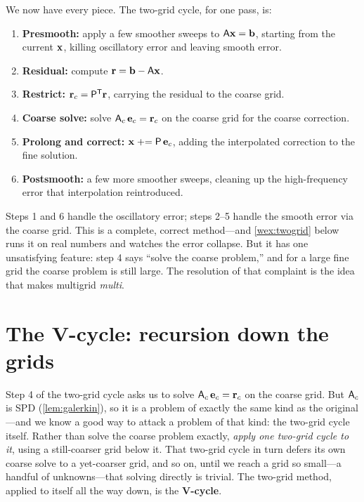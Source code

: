 We now have every piece. The two-grid cycle, for one pass, is:
\begin{enumerate}[nosep]
\item \textbf{Presmooth:} apply a few smoother sweeps to $\mathsf{A}\mathbf{x}=\mathbf{b}$, starting from
  the current $\mathbf{x}$, killing oscillatory error and leaving smooth error.
\item \textbf{Residual:} compute $\mathbf{r} = \mathbf{b} - \mathsf{A}\mathbf{x}$.
\item \textbf{Restrict:} $\mathbf{r}_c = \mathsf{P}^{\mathsf T}\mathbf{r}$, carrying the residual to the
  coarse grid.
\item \textbf{Coarse solve:} solve $\mathsf{A}_c\,\mathbf{e}_c = \mathbf{r}_c$ on the coarse grid for the
  coarse correction.
\item \textbf{Prolong and correct:} $\mathbf{x} \mathrel{+}= \mathsf{P}\,\mathbf{e}_c$, adding the
  interpolated correction to the fine solution.
\item \textbf{Postsmooth:} a few more smoother sweeps, cleaning up the high-frequency
  error that interpolation reintroduced.
\end{enumerate}
Steps 1 and 6 handle the oscillatory error; steps 2--5 handle the smooth error via the
coarse grid. This is a complete, correct method---and \cref{wex:twogrid} below runs it on
real numbers and watches the error collapse. But it has one unsatisfying feature: step 4
says ``solve the coarse problem,'' and for a large fine grid the coarse problem is still
large. The resolution of that complaint is the idea that makes multigrid \emph{multi}.

\section{The V-cycle: recursion down the grids}
\label{sec:vcycle}

Step 4 of the two-grid cycle asks us to solve $\mathsf{A}_c\,\mathbf{e}_c=\mathbf{r}_c$ on the coarse grid.
But $\mathsf{A}_c$ is SPD (\cref{lem:galerkin}), so it is a problem of exactly the same kind
as the original---and we know a good way to attack a problem of that kind: the two-grid
cycle itself. Rather than solve the coarse problem exactly, \emph{apply one two-grid cycle
to it}, using a still-coarser grid below it. That two-grid cycle in turn defers its own
coarse solve to a yet-coarser grid, and so on, until we reach a grid so small---a handful
of unknowns---that solving directly is trivial. The two-grid method, applied to itself all
the way down, is the \textbf{V-cycle}.

